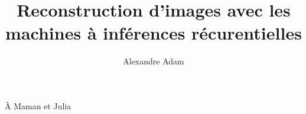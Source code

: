 \documentclass[
  normalmargins,
  11pt,
  openany,
  onehalfspacing,
]{ut-thesis}
\author{Alexandre Adam}
\title{Reconstruction d'images avec les machines à inférences récurentielles}
\begin{document}
  \frontmatter
    \maketitle

    \begin{resume}
    \end{resume}
    \begin{abstract}
    \end{abstract}

    \tableofcontents
    \listoftables
    \listoffigures
    \printglossaries

        \clearpage
    \begin{dedication}
      À Maman et Julia
    \end{dedication}
    \begin{acknowledgements}
            

           


    \end{acknowledgements}
  \mainmatter
        \glsaddall
    

%

{\footnotesize
  
}

  \appendix
  
  

\end{document}
